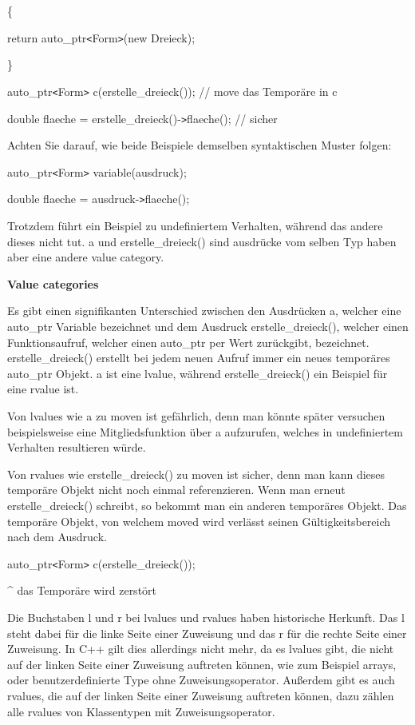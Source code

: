 \documentclass{article}
\begin{document}
\{    

\parindent=14pt
return auto\_ptr\texttt{<}Form\texttt{>}(new Dreieck);

\parindent=0pt
\}

auto\_ptr\texttt{<}Form\texttt{>} c(erstelle\_dreieck()); // move das Temporäre 
in c

double flaeche = erstelle\_dreieck()-\texttt{>}flaeche(); // sicher

Achten Sie darauf, wie beide Beispiele demselben syntaktischen Muster folgen:

auto\_ptr\texttt{<}Form\texttt{>} variable(ausdruck);

double flaeche = ausdruck-\texttt{>}flaeche();

Trotzdem führt ein Beispiel zu undefiniertem Verhalten, während das andere dieses 
nicht tut. a und erstelle\_dreieck() sind ausdrücke vom selben Typ haben aber 
eine andere value category.

\vspace{12pt}
\textbf{Value categories}

Es gibt einen signifikanten Unterschied zwischen den Ausdrücken a, welcher eine 
auto\_ptr Variable bezeichnet und dem Ausdruck erstelle\_dreieck(), welcher einen 
Funktionsaufruf, welcher einen auto\_ptr per Wert zurückgibt, bezeichnet. erstelle\_dreieck() 
erstellt bei jedem neuen Aufruf immer ein neues temporäres auto\_ptr Objekt. a 
ist eine lvalue, während erstelle\_dreieck() ein Beispiel für eine rvalue ist.

Von lvalues wie a zu moven ist gefährlich, denn man könnte später versuchen 
beispielsweise eine Mitgliedsfunktion über a aufzurufen, welches in undefiniertem 
Verhalten resultieren würde.

Von rvalues wie erstelle\_dreieck() zu moven ist sicher, denn man kann dieses temporäre 
Objekt nicht noch einmal referenzieren. Wenn man erneut erstelle\_dreieck() schreibt, 
so bekommt man ein anderen temporäres Objekt. Das temporäre Objekt, von welchem 
moved wird verlässt seinen Gültigkeitsbereich nach dem Ausdruck.

auto\_ptr\texttt{<}Form\texttt{>} c(erstelle\_dreieck());       

\parindent=115pt
\textasciicircum{} das Temporäre wird zerstört

\parindent=0pt
Die Buchstaben l und r bei lvalues und rvalues haben historische Herkunft. Das 
l steht dabei für die linke Seite einer Zuweisung und das r für die rechte Seite 
einer Zuweisung. In C++ gilt dies allerdings nicht mehr, da es lvalues gibt, die 
nicht auf der linken Seite einer Zuweisung auftreten können, wie zum Beispiel 
arrays, oder benutzerdefinierte Type ohne Zuweisungsoperator. Außerdem gibt es 
auch rvalues, die auf der linken Seite einer Zuweisung auftreten können, dazu 
zählen alle rvalues von Klassentypen mit Zuweisungsoperator.
\end{document}
